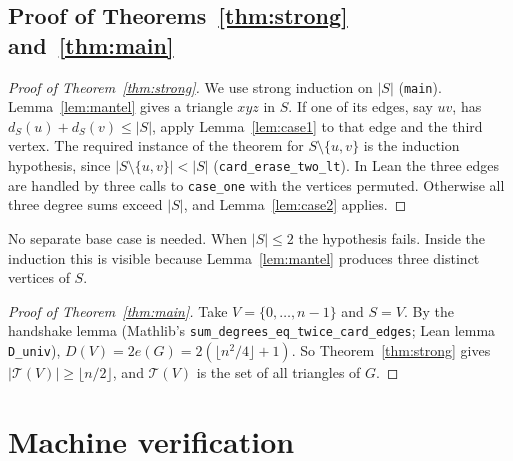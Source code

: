 \documentclass[11pt]{amsart}
\theoremstyle{plain}
\theoremstyle{definition}
\newcommand{\Tri}{\mathcal{T}}
\newcommand{\lean}[1]{\texttt{#1}}
\begin{document}
\subsection{Proof of Theorems~\ref{thm:strong} and~\ref{thm:main}}

\begin{proof}[Proof of Theorem~\ref{thm:strong}]
We use strong induction on $|S|$ (\lean{main}). Lemma~\ref{lem:mantel} gives a triangle $xyz$ in
$S$. If one of its edges, say $uv$, has $d_S(u)+d_S(v)\le|S|$, apply Lemma~\ref{lem:case1} to
that edge and the third vertex. The required instance of the theorem for $S\setminus\{u,v\}$ is
the induction hypothesis, since $|S\setminus\{u,v\}|<|S|$ (\lean{card\_erase\_two\_lt}). In Lean the
three edges are handled by three calls to \lean{case\_one} with the vertices permuted. Otherwise
all three degree sums exceed $|S|$, and Lemma~\ref{lem:case2} applies.
\end{proof}

No separate base case is needed. When $|S|\le 2$ the hypothesis fails. Inside the induction this
is visible because Lemma~\ref{lem:mantel} produces three distinct vertices of $S$.

\begin{proof}[Proof of Theorem~\ref{thm:main}]
Take $V=\{0,\dots,n-1\}$ and $S=V$. By the handshake lemma (Mathlib's
\lean{sum\_degrees\_eq\_twice\_card\_edges}; Lean lemma \lean{D\_univ}), $D(V)=2e(G)=2(\lfloor
n^2/4\rfloor+1)$. So Theorem~\ref{thm:strong} gives $|\Tri(V)|\ge\lfloor n/2\rfloor$, and
$\Tri(V)$ is the set of all triangles of $G$.
\end{proof}

\section{Machine verification}
\end{document}
